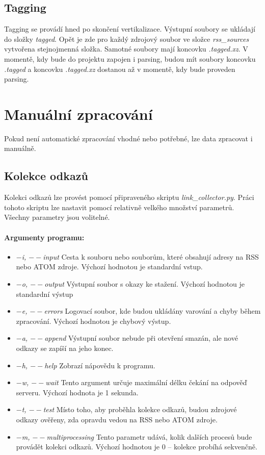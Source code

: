 \subsection{Tagging}
Tagging se provádí hned po skončení vertikalizace. Výstupní soubory se ukládají do složky
\textit{tagged}. Opět je zde pro každý zdrojový soubor ve složce \textit{rss\_sources} vytvořena
stejnojmenná složka. Samotné soubory mají koncovku \textit{.tagged.xz}. V momentě, kdy bude do
projektu zapojen i parsing, budou mít soubory koncovku \textit{.tagged} a koncovku \textit{.tagged.xz}
dostanou až v momentě, kdy bude proveden parsing.

\section{Manuální zpracování}
Pokud není automatické zpracování vhodné nebo potřebné, lze data zpracovat i manuálně.

\subsection{Kolekce odkazů}
Kolekci odkazů lze provést pomocí připraveného skriptu \textit{link\_collector.py}.
Práci tohoto skriptu lze nastavit pomocí relativně velkého množství parametrů. Všechny
parametry jsou volitelné.

\paragraph{Argumenty programu: }
\begin{itemize}
    \item \textit{$-$i, $--$input} Cesta k souboru nebo souborům, které obsahují adresy na RSS nebo ATOM zdroje. Výchozí hodnotou je standardní vstup.
    \item \textit{$-$o, $--$output} Výstupní soubor s okazy ke stažení. Výchozí hodnotou je standardní výstup
    \item \textit{$-$e, $--$errors} Logovací soubor, kde budou ukládány varování a chyby během zpracování. Výchozí hodnotou je chybový výstup.
    \item \textit{$-$a, $--$append} Výstupní soubor nebude při otevření smazán, ale nové odkazy se zapíší na jeho konec.
    \item \textit{$-$h, $--$help} Zobrazí nápovědu k programu.
    \item \textit{$-$w, $--$wait} Tento argument určuje maximální délku čekání na odpověď serveru. Výchozí hodnota je 1 sekunda.
    \item \textit{$-$t, $--$test} Místo toho, aby proběhla kolekce odkazů, budou zdrojové odkazy ověřeny, zda opravdu vedou na RSS nebo ATOM zdroje.
    \item \textit{$-$m, $--$multiprocessing} Tento parametr udává, kolik dalších procesů bude provádět kolekci odkazů. Výchozí hodnotou je 0 -- kolekce probíhá sekvenčně.
\end{itemize}

